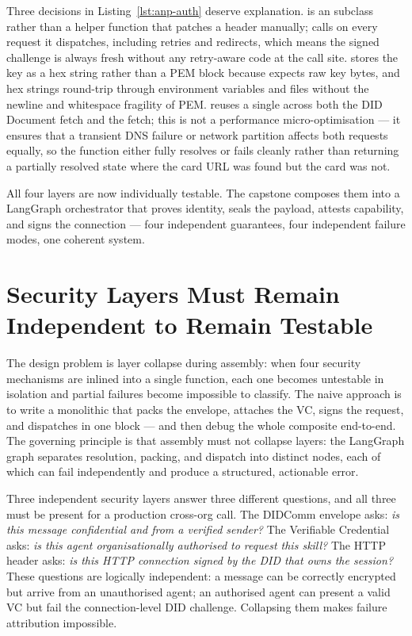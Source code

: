 Three decisions in Listing~\ref{lst:anp-auth} deserve explanation.
 is an  subclass rather than a helper
function that patches a header manually;  calls
 on every request it dispatches, including retries and
redirects, which means the signed challenge is always fresh without any
retry-aware code at the call site. 
stores the key as a hex string rather than a PEM block because
 expects raw key bytes, and hex strings round-trip
through environment variables and  files without the newline
and whitespace fragility of PEM.  reuses a
single  across both the DID Document fetch and the
 fetch; this is not a performance micro-optimisation --- it
ensures that a transient DNS failure or network partition affects both
requests equally, so the function either fully resolves or fails cleanly
rather than returning a partially resolved state where the card URL was
found but the card was not.

All four layers are now individually testable. The capstone composes them
into a LangGraph orchestrator that proves identity, seals the payload,
attests capability, and signs the connection --- four independent
guarantees, four independent failure modes, one coherent system.


\section{Security Layers Must Remain Independent to Remain Testable}
\label{sec:anp-handshake}

The design problem is layer collapse during assembly: when four security
mechanisms are inlined into a single function, each one becomes
untestable in isolation and partial failures become impossible to
classify. The naive approach is to write a monolithic
 that packs the envelope, attaches the VC, signs
the request, and dispatches in one block --- and then debug the whole
composite end-to-end. The governing principle is that assembly must not
collapse layers: the LangGraph graph separates resolution, packing, and
dispatch into distinct nodes, each of which can fail independently and
produce a structured, actionable error.

Three independent security layers answer three different questions, and all
three must be present for a production cross-org call. The DIDComm
envelope asks: \emph{is this message confidential and from a verified
sender?} The Verifiable Credential asks: \emph{is this agent
organisationally authorised to request this skill?} The
 HTTP header asks: \emph{is this HTTP connection signed
by the DID that owns the session?} These questions are logically
independent: a message can be correctly encrypted but arrive from an
unauthorised agent; an authorised agent can present a valid VC but fail
the connection-level DID challenge. Collapsing them makes failure
attribution impossible.

